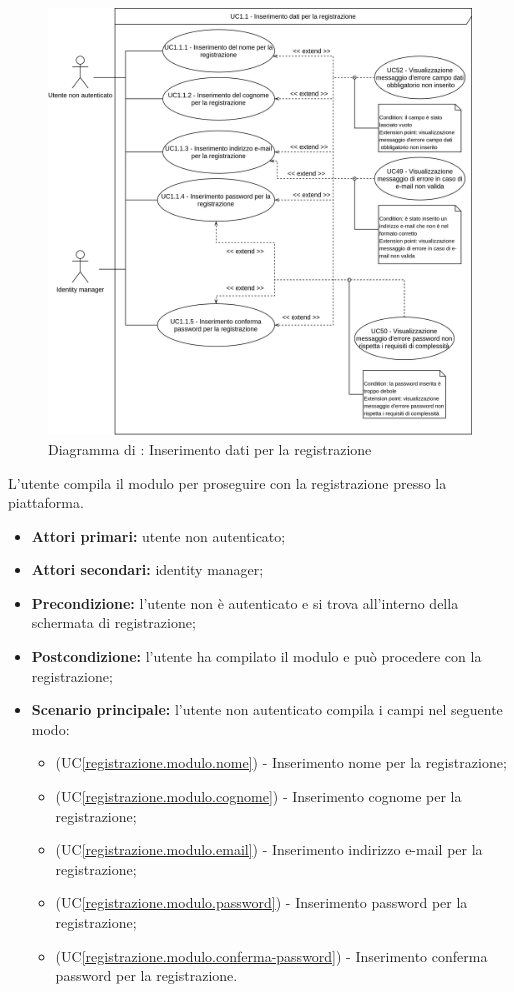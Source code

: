\label{registrazione.modulo}

\begin{figure}[H]
	\centering
	\includegraphics[scale=0.6]{Immagini/DiagrammiUC/AccessoAllaPiattaforma/InserimentoDatiRegistrazione.png}
	\caption{Diagramma di \actualSubUC: Inserimento dati per la registrazione}
	\label{fig:registrazione.modulo}
\end{figure}

L'utente compila il modulo per proseguire con la registrazione presso la piattaforma.
\begin{itemize}
	\item \textbf{Attori primari:} utente non autenticato;
	\item \textbf{Attori secondari:} identity manager;
	\item \textbf{Precondizione:} l'utente non è autenticato e si trova all'interno della schermata di registrazione;
	\item \textbf{Postcondizione:} l'utente ha compilato il modulo e può procedere con la registrazione;
	\item \textbf{Scenario principale:} l'utente non autenticato compila i campi nel seguente modo:
	\begin{itemize}
		\item (UC\ref{registrazione.modulo.nome}) - Inserimento nome per la registrazione;
		\item (UC\ref{registrazione.modulo.cognome}) - Inserimento cognome per la registrazione;
		\item (UC\ref{registrazione.modulo.email}) - Inserimento indirizzo e-mail per la registrazione;
		\item (UC\ref{registrazione.modulo.password}) - Inserimento password per la registrazione;
		\item (UC\ref{registrazione.modulo.conferma-password}) - Inserimento conferma password per la registrazione.
	\end{itemize}
\end{itemize}

